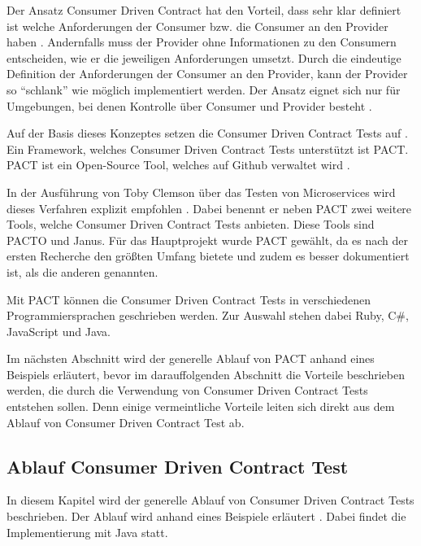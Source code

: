 \documentclass{llncs}
\begin{document}
Der Ansatz Consumer Driven Contract hat den Vorteil, dass sehr klar definiert ist welche Anforderungen der Consumer bzw. die Consumer an den Provider haben \cite{vitz2016inno}. Andernfalls muss der Provider ohne Informationen zu den Consumern entscheiden, wie er die jeweiligen Anforderungen umsetzt. Durch die eindeutige Definition der Anforderungen der Consumer an den Provider, kann der Provider so \enquote{schlank} wie möglich implementiert werden. Der Ansatz eignet sich nur für Umgebungen, bei denen Kontrolle über Consumer und Provider besteht \cite{bayer2015jaxcenter}.

Auf der Basis dieses Konzeptes setzen die Consumer Driven Contract Tests auf \cite{bayer2015jaxcenter, vitz2016inno, Robinson2006}. Ein Framework, welches Consumer Driven Contract Tests unterstützt ist PACT. PACT ist ein Open-Source Tool, welches auf Github verwaltet wird \cite{pact}.

In der Ausführung von Toby Clemson über das Testen von Microservices wird dieses Verfahren explizit empfohlen \cite{Clemson2014}. Dabei benennt er neben PACT zwei weitere Tools, welche Consumer Driven Contract Tests anbieten. Diese Tools sind PACTO und Janus. Für das Hauptprojekt wurde PACT gewählt, da es nach der ersten Recherche den größten Umfang bietete und zudem es besser dokumentiert ist, als die anderen genannten.

Mit PACT können die Consumer Driven Contract Tests in verschiedenen Programmiersprachen geschrieben werden. Zur Auswahl stehen dabei Ruby, C\#, JavaScript und Java. 

Im nächsten Abschnitt wird der generelle Ablauf von PACT anhand eines Beispiels erläutert, bevor im darauffolgenden Abschnitt die Vorteile beschrieben werden, die durch die Verwendung von Consumer Driven Contract Tests entstehen sollen. Denn einige vermeintliche Vorteile leiten sich direkt aus dem Ablauf von Consumer Driven Contract Test ab.

\subsection{Ablauf Consumer Driven Contract Test}
In diesem Kapitel wird der generelle Ablauf von Consumer Driven Contract Tests beschrieben. Der Ablauf wird anhand eines Beispiele erläutert \cite{bayer2015jaxcenter, vitz2016inno, Vincent2015}. Dabei findet die Implementierung mit Java statt.
\end{document}
